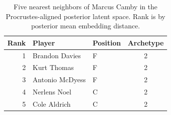 \begin{table}[htbp]
  \centering\small
  \begin{tabular}{rllc}
    \toprule
    Rank & Player & Position & Archetype \\
    \midrule
    1 & Brandon Davies & F & 2 \\
    2 & Kurt Thomas & F & 2 \\
    3 & Antonio McDyess & F & 2 \\
    4 & Nerlens Noel & C & 2 \\
    5 & Cole Aldrich & C & 2 \\
    \bottomrule
  \end{tabular}
  \caption{Five nearest neighbors of Marcus Camby in the Procrustes-aligned posterior latent space. Rank is by posterior mean embedding distance.}
  \label{tab:Marcus_Camby_neighbors}
\end{table}

